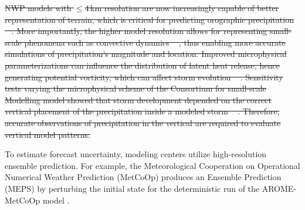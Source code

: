 \documentclass{ametsocV5}
\providecommand{\DIFdel}[1]{{\protect\color{red}\sout{#1}}}                      %
\providecommand{\DIFdelbegin}{} %
\providecommand{\DIFdelend}{} %
\newcommand{\DIFscaledelfig}{0.5}
\newlength{\DIFdelgraphicswidth} %
\newlength{\DIFdelgraphicsheight} %
\newcommand{\DIFdelincludegraphics}[2][]{%
\sbox{\DIFdelgraphicsbox}{\DIFOincludegraphics[#1]{#2}}%
\settoboxwidth{\DIFdelgraphicswidth}{\DIFdelgraphicsbox} %
\settoboxtotalheight{\DIFdelgraphicsheight}{\DIFdelgraphicsbox} %
\scalebox{\DIFscaledelfig}{%
\parbox[b]{\DIFdelgraphicswidth}{\usebox{\DIFdelgraphicsbox}\\[-\baselineskip] \rule{\DIFdelgraphicswidth}{0em}}\llap{\resizebox{\DIFdelgraphicswidth}{\DIFdelgraphicsheight}{%
\setlength{\unitlength}{\DIFdelgraphicswidth}%
\begin{picture}(1,1)%
\thicklines\linethickness{2pt} %
{\color[rgb]{1,0,0}\put(0,0){\framebox(1,1){}}}%
{\color[rgb]{1,0,0}\put(0,0){\line( 1,1){1}}}%
{\color[rgb]{1,0,0}\put(0,1){\line(1,-1){1}}}%
\end{picture}%
}\hspace*{3pt}}} %
} %
\DeclareRobustCommand{\DIFdelbegin}{\DIFOdelbegin \let\includegraphics\DIFdelincludegraphics} %
\DeclareRobustCommand{\DIFdelend}{\DIFOaddend \let\includegraphics\DIFOincludegraphics} %
\begin{document}
    \DIFdelbegin \DIFdel{NWP models with $\leq$4\,km resolution are now increasingly capable of better representation of terrain, which is critical for predicting orographic precipitation \mbox{%
\citep{colle_59_2000, colle_1314_2005, garvert_1314_2005, schwartz_reproducing_2014}}\hspace{0pt}%
. More importantly, the higher model resolution allows for representing small-scale phenomena such as convective dynamics \mbox{%
\citep{gowan_validation_2018}}\hspace{0pt}%
, thus enabling more accurate simulations of precipitation's magnitude and location. Improved microphysical parameterizations can influence the distribution of latent heat release, hence generating potential vorticity, which can affect storm evolution \mbox{%
\citep{joos_influence_2012}}\hspace{0pt}%
. Sensitivity tests varying the microphysical scheme of the Consortium for small-scale Modelling model showed that storm development depended on the correct vertical placement of the precipitation inside a modeled storm \mbox{%
\citep{joos_influence_2012}}\hspace{0pt}%
. Therefore, accurate observations of precipitation in the vertical are required to evaluate vertical model patterns. 
    }%

\DIFdelend %
    To estimate forecast uncertainty, modeling centers utilize high-resolution ensemble prediction. For example, the Meteorological Cooperation on Operational Numerical Weather Prediction (MetCoOp) produces an Ensemble Prediction (MEPS) by perturbing the initial state for the deterministic run of the  AROME-MetCoOp model \citep[AROME-Applications of Research to Operations at Mesoscale;][]{frogner_convection-permitting_2019}. 
\end{document}
